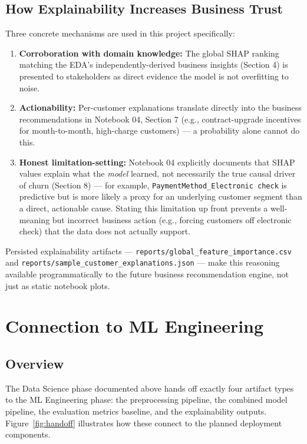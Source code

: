 \documentclass[11pt]{article}
\newcommand{\artifact}[1]{\texttt{\color{navy}#1}}
\begin{document}
\subsection{How Explainability Increases Business Trust}

Three concrete mechanisms are used in this project specifically:
\begin{enumerate}[leftmargin=1.4em]
    \item \textbf{Corroboration with domain knowledge:} The global SHAP ranking matching the EDA's independently-derived business insights (Section 4) is presented to stakeholders as direct evidence the model is not overfitting to noise.
    \item \textbf{Actionability:} Per-customer explanations translate directly into the business recommendations in Notebook 04, Section 7 (e.g., contract-upgrade incentives for month-to-month, high-charge customers) --- a probability alone cannot do this.
    \item \textbf{Honest limitation-setting:} Notebook 04 explicitly documents that SHAP values explain what the \emph{model} learned, not necessarily the true causal driver of churn (Section 8) --- for example, \artifact{PaymentMethod\_Electronic check} is predictive but is more likely a proxy for an underlying customer segment than a direct, actionable cause. Stating this limitation up front prevents a well-meaning but incorrect business action (e.g., forcing customers off electronic check) that the data does not actually support.
\end{enumerate}

Persisted explainability artifacts --- \artifact{reports/global\_feature\_importance.csv} and \artifact{reports/sample\_customer\_explanations.json} --- make this reasoning available programmatically to the future business recommendation engine, not just as static notebook plots.

\section{Connection to ML Engineering}
\label{sec:mle}

\subsection{Overview}

The Data Science phase documented above hands off exactly four artifact types to the ML Engineering phase: the preprocessing pipeline, the combined model pipeline, the evaluation metrics baseline, and the explainability outputs. Figure~\ref{fig:handoff} illustrates how these connect to the planned deployment components.
\end{document}
